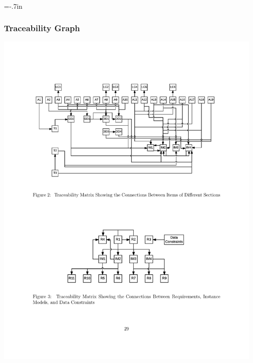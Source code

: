 \documentclass{beamer}
\begin{document}
\hoffset=-.7in %
\begin{frame}

\frametitle{Traceability Graph}

\begin{center}
\includegraphics[scale=0.75]{TraceGraph.pdf}
\end{center}

\end{frame}
\hoffset=0in

\end{document}
